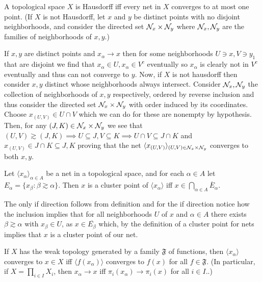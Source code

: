\documentclass[12pt,a4paper]{article}
\begin{document}
\begin{problem}\label{prob:4-32}
A topological space $X$ is Hausdorff iff every net in $X$ converges to at most one point. (If $X$ is not Hausdorff, let $x$ and $y$ be distinct points with no disjoint neighborhoods, and consider the directed set $\mathcal{N}_x \times \mathcal{N}_y$ where $\mathcal{N}_x, \mathcal{N}_y$ are the families of neighborhoods of $x, y$.)
\end{problem}
\begin{solution}
If $x,y$ are distinct points and $x_\alpha\to x$ then for some neighborhoods $U\ni x,V\ni y_1$ that are disjoint we find that $x_\alpha\in U,x_\alpha\in V^c$ eventually so $x_\alpha$ is clearly not in $V^c$ eventually and thus can not converge to $y.$ 
Now, if $X$ is not hausdorff then consider $x,y$ distinct whose neighborhoods always intersect. 
Consider $\mathcal{N}_x,\mathcal{N}_y$ the collection of neighborhoods of $x,y$ respectively, ordered by reverse inclusion and thus consider the directed set $\mathcal{N}_x\times\mathcal{N}_y$ with order induced by its coordinates. 
Choose $x_{(U,V)}\in U\cap V$ which we can do for these are nonempty by hypothesis. 
Then, for any $(J,K)\in\mathcal{N}_x\times\mathcal{N}_y$ we see that $(U,V)\gtrsim(J,K)\implies U\subseteq J,V\subseteq K\implies U\cap V\subseteq J\cap K$ and $x_{(U,V)}\in J\cap K\subseteq J,K$ proving that the net $\langle x_{(U,V)}\rangle_{(U,V)\in \mathcal{N}_x\times\mathcal{N}_y}$ converges to both $x,y.$  
\end{solution}
\begin{problem}\label{prob:4-33}
Let $\langle x_\alpha \rangle_{\alpha \in A}$ be a net in a topological space, and for each $\alpha \in A$ let $E_\alpha = \{x_\beta : \beta \gtrsim \alpha\}$. Then $x$ is a cluster point of $\langle x_\alpha \rangle$ iff $x \in \bigcap_{\alpha \in A} \overline{E}_\alpha$.
\end{problem}
\begin{solution}
The only if direction follows from definition and for the if direction notice how the inclusion implies that for all neighborhoods $U$ of $x$ and $\alpha\in A$ there exists $\beta\gtrsim\alpha$ with $x_\beta\in U$, as $x\in \overline{E_\beta}$ which, by the definition of a cluster point for nets implies that $x$ is a cluster point of our net.  
\end{solution}
\begin{problem}\label{prob:4-34}
If $X$ has the weak topology generated by a family $\mathfrak{F}$ of functions, then $\langle x_\alpha \rangle$ converges to $x \in X$ iff $\langle f(x_\alpha) \rangle$ converges to $f(x)$ for all $f \in \mathfrak{F}$. (In particular, if $X = \prod_{i \in I} X_i$, then $x_\alpha \to x$ iff $\pi_i(x_\alpha) \to \pi_i(x)$ for all $i \in I$..)
\end{problem}
\end{document}
